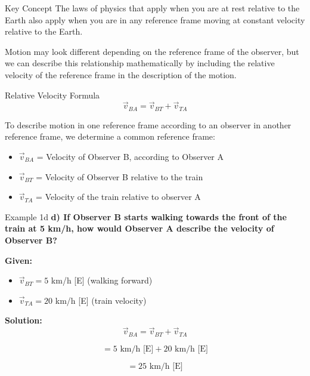 \documentclass{beamer}
\begin{document}
\begin{frame}{Key Concept}
The laws of physics that apply when you are at rest relative to the Earth also apply when you are in any reference frame moving at constant velocity relative to the Earth.

\vspace{0.5cm}

Motion may look different depending on the reference frame of the observer, but we can describe this relationship mathematically by including the relative velocity of the reference frame in the description of the motion.
\end{frame}

\begin{frame}{Relative Velocity Formula}
\[\vec{v}_{BA} = \vec{v}_{BT} + \vec{v}_{TA}\]

\vspace{0.5cm}

To describe motion in one reference frame according to an observer in another reference frame, we determine a common reference frame:

\vspace{0.3cm}

\begin{itemize}
\item \(\vec{v}_{BA}\) = Velocity of Observer B, according to Observer A
\item \(\vec{v}_{BT}\) = Velocity of Observer B relative to the train
\item \(\vec{v}_{TA}\) = Velocity of the train relative to observer A
\end{itemize}
\end{frame}

\begin{frame}{Example 1d}
\textbf{d) If Observer B starts walking towards the front of the train at 5 km/h, how would Observer A describe the velocity of Observer B?}



\textbf{Given:}
\begin{itemize}
\item \(\vec{v}_{BT} = 5\) km/h [E] (walking forward)
\item \(\vec{v}_{TA} = 20\) km/h [E] (train velocity)
\end{itemize}



\textbf{Solution:}
\[\vec{v}_{BA} = \vec{v}_{BT} + \vec{v}_{TA}\]

\[= 5 \text{ km/h [E]} + 20 \text{ km/h [E]}\]

\[= 25 \text{ km/h [E]}\]
\end{frame}
\end{document}
